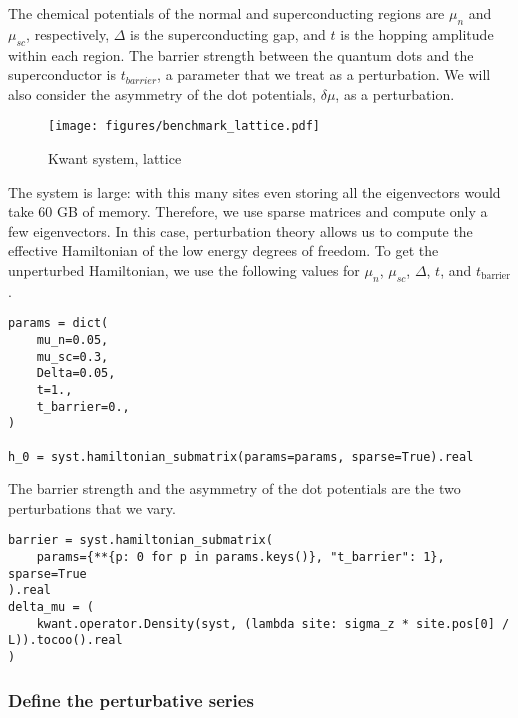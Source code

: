 The chemical potentials of the normal and superconducting regions are $\mu_n$
and $\mu_{sc}$, respectively, $\Delta$ is the superconducting gap, and $t$
is the hopping amplitude within each region.
The barrier strength between the quantum dots and the superconductor is
$t_{barrier}$, a parameter that we treat as a perturbation.
We will also consider the asymmetry of the dot potentials, $\delta \mu$, as a
perturbation.
%
\begin{figure}
\centering
\texttt{[image: figures/benchmark\_lattice.pdf]}
\caption{Kwant system, lattice}
\label{fig:benchmark_lattice}
\end{figure}
%
The system is large: with this many sites even storing all the eigenvectors
would take 60 GB of memory.
Therefore, we use sparse matrices and compute only a few eigenvectors.
In this case, perturbation theory allows us to compute the effective
Hamiltonian of the low energy degrees of freedom.
%
To get the unperturbed Hamiltonian, we use the following values for $\mu_n$,
$\mu_{sc}$, $\Delta$, $t$, and $t_{\text{barrier}}$.
%
\begin{verbatim}
params = dict(
    mu_n=0.05,
    mu_sc=0.3,
    Delta=0.05,
    t=1.,
    t_barrier=0.,
)

h_0 = syst.hamiltonian_submatrix(params=params, sparse=True).real
\end{verbatim}

The barrier strength and the asymmetry of the dot potentials are the two
perturbations that we vary.

\begin{verbatim}
barrier = syst.hamiltonian_submatrix(
    params={**{p: 0 for p in params.keys()}, "t_barrier": 1}, sparse=True
).real
delta_mu = (
    kwant.operator.Density(syst, (lambda site: sigma_z * site.pos[0] / L)).tocoo().real
)
\end{verbatim}

\subsubsection{Define the perturbative series}

